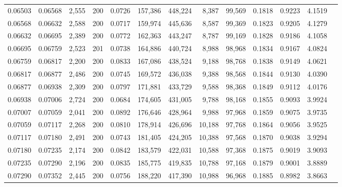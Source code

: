 \begin{tabular}{rrrrrrrrrrrrr}
0.06503 & 0.06568 & 2,555 & 200 &                                     0.0726 & 157,386 & 448,224 &   8,387 &  99,569 & 0.1818 & 0.9223 & 4.1519 \\
0.06568 & 0.06632 & 2,588 & 200 &                                     0.0717 & 159,974 & 445,636 &   8,587 &  99,369 & 0.1823 & 0.9205 & 4.1279 \\
0.06632 & 0.06695 & 2,389 & 200 &                                     0.0772 & 162,363 & 443,247 &   8,787 &  99,169 & 0.1828 & 0.9186 & 4.1058 \\
0.06695 & 0.06759 & 2,523 & 201 &                                     0.0738 & 164,886 & 440,724 &   8,988 &  98,968 & 0.1834 & 0.9167 & 4.0824 \\
0.06759 & 0.06817 & 2,200 & 200 &                                     0.0833 & 167,086 & 438,524 &   9,188 &  98,768 & 0.1838 & 0.9149 & 4.0621 \\
0.06817 & 0.06877 & 2,486 & 200 &                                     0.0745 & 169,572 & 436,038 &   9,388 &  98,568 & 0.1844 & 0.9130 & 4.0390 \\
0.06877 & 0.06938 & 2,309 & 200 &                                     0.0797 & 171,881 & 433,729 &   9,588 &  98,368 & 0.1849 & 0.9112 & 4.0176 \\
0.06938 & 0.07006 & 2,724 & 200 &                                     0.0684 & 174,605 & 431,005 &   9,788 &  98,168 & 0.1855 & 0.9093 & 3.9924 \\
0.07007 & 0.07059 & 2,041 & 200 &                                     0.0892 & 176,646 & 428,964 &   9,988 &  97,968 & 0.1859 & 0.9075 & 3.9735 \\
0.07059 & 0.07117 & 2,268 & 200 &                                     0.0810 & 178,914 & 426,696 &  10,188 &  97,768 & 0.1864 & 0.9056 & 3.9525 \\
0.07117 & 0.07180 & 2,491 & 200 &                                     0.0743 & 181,405 & 424,205 &  10,388 &  97,568 & 0.1870 & 0.9038 & 3.9294 \\
0.07180 & 0.07235 & 2,174 & 200 &                                     0.0842 & 183,579 & 422,031 &  10,588 &  97,368 & 0.1875 & 0.9019 & 3.9093 \\
0.07235 & 0.07290 & 2,196 & 200 &                                     0.0835 & 185,775 & 419,835 &  10,788 &  97,168 & 0.1879 & 0.9001 & 3.8889 \\
0.07290 & 0.07352 & 2,445 & 200 &                                     0.0756 & 188,220 & 417,390 &  10,988 &  96,968 & 0.1885 & 0.8982 & 3.8663 \\

\end{tabular}
